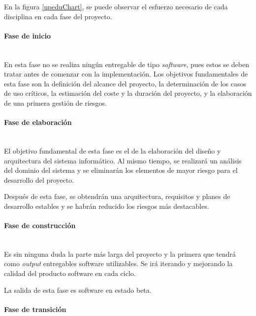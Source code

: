 \documentclass[twoside]{report}
\begin{document}
En la figura \ref{upeduChart}, se puede observar el esfuerzo necesario de cada disciplina en cada fase del proyecto.

\paragraph{Fase de inicio}\mbox{}\\

En esta fase no se realiza ningún entregable de tipo \textit{software}, pues estos se deben tratar antes de comenzar con la implementación. Los objetivos fundamentales de esta fase son la definición del alcance del proyecto,  la determinación de los casos de uso críticos, la estimación del coste y la duración del proyecto, y la elaboración de una primera gestión de riesgos.

\paragraph{Fase de elaboración}\mbox{}\\

El objetivo fundamental de esta fase \cite{pgpup} es el de la elaboración del diseño y arquitectura del sistema informático. Al mismo tiempo, se realizará un análisis del dominio del sistema y se eliminarán los elementos de mayor riesgo para el desarrollo del proyecto.

Después de esta fase, se obtendrán una arquitectura, requisitos y planes de desarrollo estables y se habrán reducido los riesgos más destacables.


\paragraph{Fase de construcción}\mbox{}\\

Es sin ninguna duda la parte más larga del proyecto y la primera que tendrá como \textit{output} entregables software utilizables. Se irá iterando y mejorando la calidad del producto software en cada ciclo.

La salida de esta fase \cite{pgpup} es software en estado beta.

\paragraph{Fase de transición}\mbox{}\\
\end{document}
